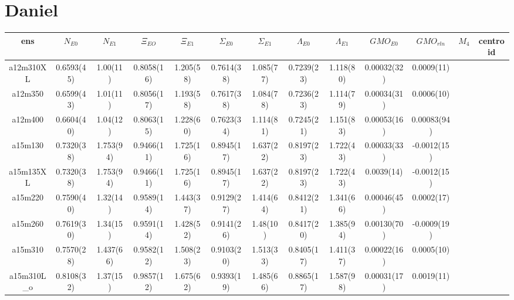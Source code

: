 \documentclass{article}
\begin{document}
 \clearpage
\section*{Daniel}
\begin{table}[h!]
  \centering
 \setlength{\arrayrulewidth}{0.5mm}
\setlength{\tabcolsep}{13pt}
\renewcommand{\arraystretch}{2}
 \begin{tabular}{|| c |c | c | c | c | c | c | c | c | c | c | c | c ||} 
 \hline
 ens & $N_{E0}$ & $N_{E1}$ & $\Xi_{EO}$ &  $\Xi_{E1}$ & $\Sigma_{E0}$ & $\Sigma_{E1}$ & $\Lambda_{E0}$ & $\Lambda_{E1}$ & $GMO_{E0}$ &  $GMO_{rln}$ & $M_4$ & centroid \\ [0.8ex] 
 \hline\hline
 a12m310XL
 & {0.6593(45)}   &   {1.00(11)} & {0.8058(16)}   & {1.205(58)}   & {0.7614(38)}  & {1.085(77)}   & {0.7239(23)}  & {1.118(80)}  & {0.00032(32)}  & {0.0009(11)}  &  \\ 
 \hline
 a12m350 
 & {0.6599(43)}   &   {1.01(11)} & {0.8056(17)}   & {1.193(58)}   & {0.7617(38)}  & {1.084(78)}   & {0.7236(23)}  & {1.114(79)}  & {0.00034(31)}  & {0.0006(10)}  & \\
 \hline
 a12m400 
 & {0.6604(40)}   &   {1.04(12)} & {0.8063(15)}   & {1.228(60)}   & {0.7623(34)}  & {1.114(81)}   & {0.7245(21)}  & {1.151(83)}  & {0.00053(16)}  & {0.00083(94)}  &  \\
 \hline
 a15m130  
  & {0.7320(38)}   &   {1.753(94)} & {0.9466(11)}   & {1.725(16)}   & {0.8945(17)}  & {1.637(22)}   & {0.8197(23)}  & {1.722(43)}  & {0.00033(33)}  & {-0.0012(15)}  &   \\
 \hline
 a15m135XL 
& {0.7320(38)}   &   {1.753(94)} & {0.9466(11)}   & {1.725(16)}   & {0.8945(17)}  & {1.637(22)}   & {0.8197(23)}  & {1.722(43)}  & {0.0039(14)}  & {-0.0012(15)}  &  \\
 \hline
 a15m220
 & {0.7590(40)}   &   {1.32(14)} & {0.9589(14)}   & {1.443(37)}   & {0.9129(27)}  & {1.414(64)}   & {0.8412(21)}  & {1.341(66)}  & {0.00046(45)}  & {0.0002(17)}  &  \\
 \hline
 a15m260
  & {0.7619(30)}   &   {1.34(15)} & {0.9591(14)}   & {1.428(52)}   & {0.9141(26)}  & {1.48(10)}   & {0.8417(20)}  & {1.385(94)}  & {0.00130(70)}  & {-0.0009(19)}  &  \\
 \hline
 a15m310
  & {0.7570(28)}   &   {1.437(66)} & {0.9582(12)}   & {1.508(23)}   & {0.9103(20)}  & {1.513(33)}   & {0.8405(17)}  & {1.411(37)}  & {0.00022(16)}  & {0.0005(10)}  &  \\
 \hline
 a15m310L_o 
 & {0.8108(32)}   &   {1.37(15)} & {0.9857(12)}   & {1.675(62)}   & {0.9393(19)}  & {1.485(66)}   & {0.8865(17)}  & {1.587(98)}  & {0.00031(17)}  & {0.0019(11)}  &  \\

\end{tabular}
\end{table}
\end{document}
